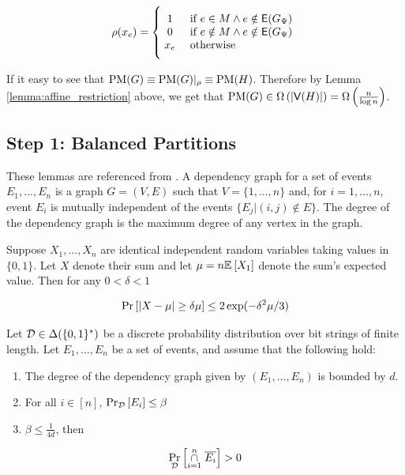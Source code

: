 \documentclass[11pt]{article}
\begin{document}
\begin{enumerate}
	\[
        \rho(x_e)=
        \Bigger[10]\{\begin{array}{@{}cl}
                1 & \text{ if $e \in M \land e \notin \Edges{G_{\EmbeddingFunc}}$} \\
                0 & \text{ if $e \notin M \land e \notin \Edges{G_{\EmbeddingFunc}}$}\\ 
                x_e & \text{ otherwise} 
        \end{array}
\]

	If it easy to see that $\text{PM}(G) \equiv \text{PM}(G)|_\rho \equiv \text{PM}(H)$. Therefore by Lemma \ref{lemma:affine_restriction} above, we get that $\text{PM}(G) \in \Omega\left(|\mathsf{V}(H)|\right) = \Omega\left(\frac{n}{\log n}\right)$. 

  \end{enumerate}


\subsection{Step 1: Balanced Partitions}
\label{sec:partition-lemma}


These lemmas are referenced from \citet[Chapter 1, Chapter 7]{mitzenmacher2017probability}.
A dependency graph for a set of events $E_1, . . . , E_n$ is a graph $G=(V, E)$ such that $V = \{1,.. . , n\}$ and,  for $i= 1,\dots, n$, event $E_i$ is mutually independent
of the events $\{E_j | (i, j) \notin E\}$. The degree of the dependency graph is the maximum degree of any vertex in the graph.


\begin{lemma}\label{lemma:mult-chernoff}
Suppose $X_1, ..., X_n$ are identical independent random variables taking values in $\{0, 1\}$. Let $X$ denote their sum and let $\mu = n\mathbb{E}_{}\left[X_1\right]$ denote the sum's expected value. Then for any $0 < \delta < 1$

\[ \Pr\left[|X - \mu| \geq \delta \mu \right] \leq 2\exp(-\delta^2\mu/3)\]
	
\end{lemma}




\begin{lemma}\label{lemma:lll}Let $\mathcal{D} \in \Delta(\{0,1\}^*)$ be a discrete probability distribution over bit strings of finite length.
  Let $E_1,...,E_n$ be a set of events, and assume that the following hold:
\begin{enumerate}
\item The degree of the dependency graph given by $(E_1, \dots, E_n)$ is bounded by $d$.

\item For all $i \in [n]$, $\Pr_{\mathcal{D}}\left[E_i \right] \leq \beta$

\item $\beta \leq \frac{1}{4d}$, then 
  
\end{enumerate}

\[ \Pr_{\mathcal{D}}\left[\overset{n}{ \underset{i=1}{\cap}} \hspace{0.1cm}  \overline{E_i} \right] > 0\]		


\end{lemma}
\end{document}
